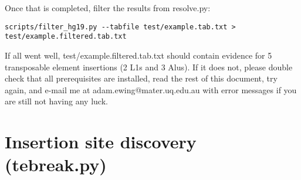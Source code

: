 \documentclass[letterpaper,11pt]{article}
\begin{document}
Once that is completed, filter the results from resolve.py:

\begin{verbatim}
scripts/filter_hg19.py --tabfile test/example.tab.txt > test/example.filtered.tab.txt
\end{verbatim}

If all went well, test/example.filtered.tab.txt should contain evidence for 5 transposable element insertions (2 L1s and 3 Alus). If it does not, please double check that all prerequisites are installed, read the rest of this document, try again, and e-mail me at adam.ewing@mater.uq.edu.au with error messages if you are still not having any luck.

\section{Insertion site discovery (tebreak.py)}
\end{document}
